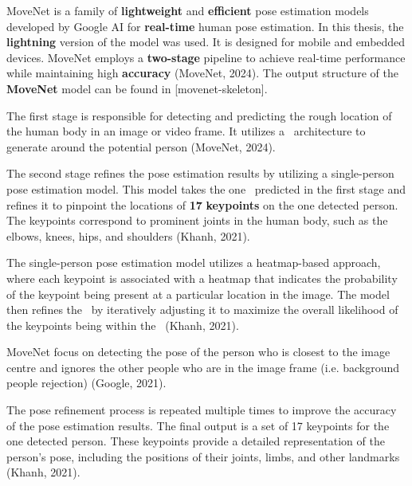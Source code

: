 
MoveNet is a family of {\bf lightweight} and {\bf efficient} pose estimation models developed by Google AI for {\bf real-time} human pose estimation. In this thesis, the {\bf lightning} version of the model was used. It is designed for mobile and embedded devices. MoveNet employs a {\bf two-stage} pipeline to achieve real-time performance while maintaining high {\bf accuracy} (\scc MoveNet, 2024). The output structure of the {\bf MoveNet} model can be found in [movenet-skeleton].

The first stage is responsible for detecting and predicting the rough location of the human body in an image or video frame. It utilizes a \SSD\ architecture to generate {\bf \BBOX} around the potential person (\scc MoveNet, 2024).

The second stage refines the pose estimation results by utilizing a single-person pose estimation model. This model takes the one \BBOX\ predicted in the first stage and refines it to pinpoint the locations of {\bf 17} {\bf keypoints} on the one detected person. The keypoints correspond to prominent joints in the human body, such as the elbows, knees, hips, and shoulders (\scc Khanh, 2021).

The single-person pose estimation model utilizes a heatmap-based approach, where each keypoint is associated with a heatmap that indicates the probability of the keypoint being present at a particular location in the image. The model then refines the \BBOX\ by iteratively adjusting it to maximize the overall likelihood of the keypoints being within the \BBOX\ (\scc Khanh, 2021).

MoveNet focus on detecting the pose of the person who is closest to the image centre and ignores the other people who are in the image frame (i.e. background people rejection) (\scc Google, 2021).

The pose refinement process is repeated multiple times to improve the accuracy of the pose estimation results. The final output is a set of 17 keypoints for the one detected person. These keypoints provide a detailed representation of the person's pose, including the positions of their joints, limbs, and other landmarks (\scc Khanh, 2021).

